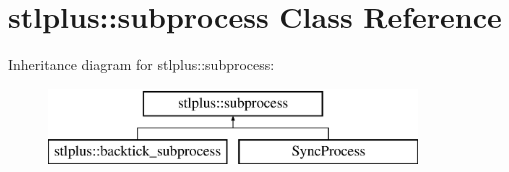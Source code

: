 \hypertarget{classstlplus_1_1subprocess}{}\section{stlplus\+:\+:subprocess Class Reference}
\label{classstlplus_1_1subprocess}
Inheritance diagram for stlplus\+:\+:subprocess\+:\begin{figure}[H]
\begin{center}
\leavevmode
\includegraphics[height=2.000000cm]{classstlplus_1_1subprocess}
\end{center}
\end{figure}
